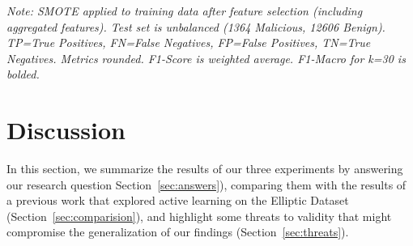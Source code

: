 \documentclass[12pt]{article}
\begin{document}
\begin{table}[htb]
  \centering
  \caption{EFC Performance: SMOTE with Feature Selection (Full Test Dataset Context) for Varying k (Experiment 3b).}
  \label{tab:exp3_smote_fs_full_test_results}
  \par\medskip
  \footnotesize
  \textit{Note: SMOTE applied to training data after feature selection (including aggregated features). Test set is unbalanced
  (1364 Malicious, 12606 Benign). TP=True Positives, FN=False Negatives, FP=False Positives, TN=True Negatives. Metrics rounded.
  F1-Score is weighted average. F1-Macro for k=30 is bolded.}
\end{table}

\section{Discussion}
\label{sec:discussion}
In this section, we summarize the results of our three experiments by answering our research question Section~\ref{sec:answers}),
comparing them with the results of a previous work that explored active learning on the Elliptic Dataset~\cite{elliptic_dataset_kaggle}
(Section~\ref{sec:comparision}), and highlight some threats to validity that might compromise the generalization of our
findings (Section~\ref{sec:threats}).
\end{document}
